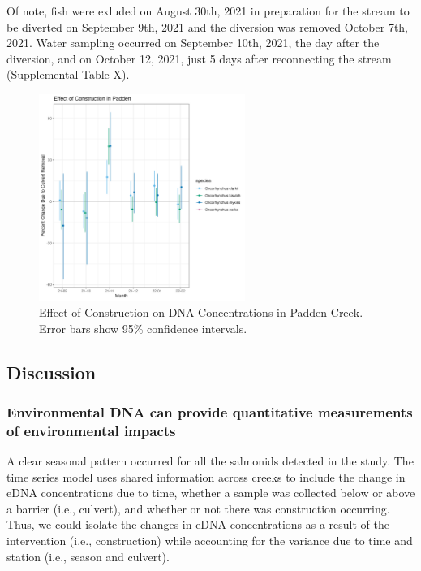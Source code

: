 \documentclass[
]{article}
\begin{document}
Of note, fish were exluded on August 30th, 2021 in preparation for the
stream to be diverted on September 9th, 2021 and the diversion was
removed October 7th, 2021. Water sampling occurred on September 10th,
2021, the day after the diversion, and on October 12, 2021, just 5 days
after reconnecting the stream (Supplemental Table X).

\begin{figure}
\centering
\includegraphics[width=0.6\textwidth,height=\textheight]{../Output/Figures/20221123_Construction_effect.png}
\caption{Effect of Construction on DNA Concentrations in Padden Creek.
Error bars show 95\% confidence intervals.}
\end{figure}

\hypertarget{discussion}{%
\subsection{Discussion}\label{discussion}}

\hypertarget{environmental-dna-can-provide-quantitative-measurements-of-environmental-impacts}{%
\subsubsection{Environmental DNA can provide quantitative measurements
of environmental
impacts}\label{environmental-dna-can-provide-quantitative-measurements-of-environmental-impacts}}

A clear seasonal pattern occurred for all the salmonids detected in the
study. The time series model uses shared information across creeks to
include the change in eDNA concentrations due to time, whether a sample
was collected below or above a barrier (i.e., culvert), and whether or
not there was construction occurring. Thus, we could isolate the changes
in eDNA concentrations as a result of the intervention (i.e.,
construction) while accounting for the variance due to time and station
(i.e., season and culvert).
\end{document}
